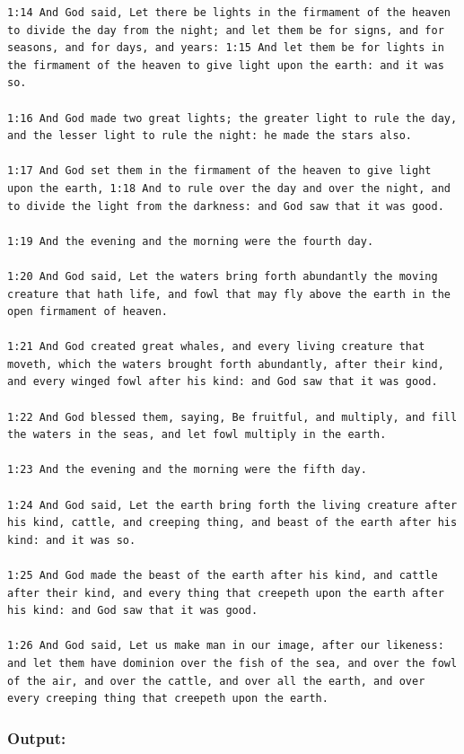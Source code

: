 \documentclass[11pt]{article}
\begin{document}
\begin{lstlisting}
1:14 And God said, Let there be lights in the firmament of the heaven
to divide the day from the night; and let them be for signs, and for
seasons, and for days, and years: 1:15 And let them be for lights in
the firmament of the heaven to give light upon the earth: and it was
so.

1:16 And God made two great lights; the greater light to rule the day,
and the lesser light to rule the night: he made the stars also.

1:17 And God set them in the firmament of the heaven to give light
upon the earth, 1:18 And to rule over the day and over the night, and
to divide the light from the darkness: and God saw that it was good.

1:19 And the evening and the morning were the fourth day.

1:20 And God said, Let the waters bring forth abundantly the moving
creature that hath life, and fowl that may fly above the earth in the
open firmament of heaven.

1:21 And God created great whales, and every living creature that
moveth, which the waters brought forth abundantly, after their kind,
and every winged fowl after his kind: and God saw that it was good.

1:22 And God blessed them, saying, Be fruitful, and multiply, and fill
the waters in the seas, and let fowl multiply in the earth.

1:23 And the evening and the morning were the fifth day.

1:24 And God said, Let the earth bring forth the living creature after
his kind, cattle, and creeping thing, and beast of the earth after his
kind: and it was so.

1:25 And God made the beast of the earth after his kind, and cattle
after their kind, and every thing that creepeth upon the earth after
his kind: and God saw that it was good.

1:26 And God said, Let us make man in our image, after our likeness:
and let them have dominion over the fish of the sea, and over the fowl
of the air, and over the cattle, and over all the earth, and over
every creeping thing that creepeth upon the earth.
\end{lstlisting}

\subsubsection*{Output:}
\end{document}
